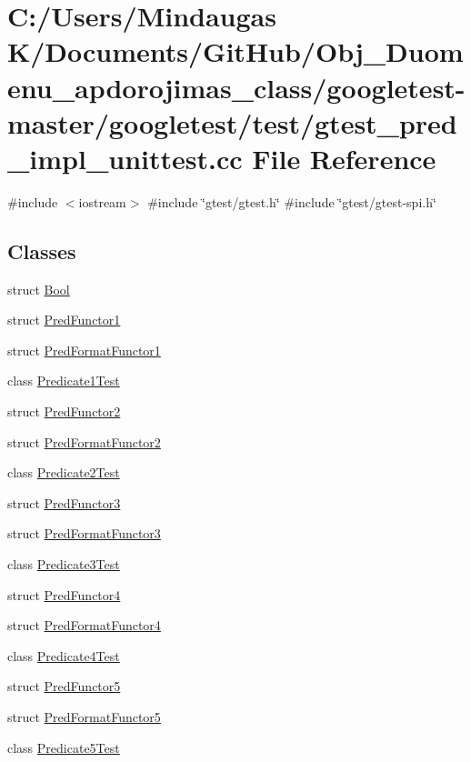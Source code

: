 \hypertarget{googletest-master_2googletest_2test_2gtest__pred__impl__unittest_8cc}{}\section{C\+:/\+Users/\+Mindaugas K/\+Documents/\+Git\+Hub/\+Obj\+\_\+\+Duomenu\+\_\+apdorojimas\+\_\+class/googletest-\/master/googletest/test/gtest\+\_\+pred\+\_\+impl\+\_\+unittest.cc File Reference}
\label{googletest-master_2googletest_2test_2gtest__pred__impl__unittest_8cc}
{\ttfamily \#include $<$iostream$>$}\newline
{\ttfamily \#include \char`\"{}gtest/gtest.\+h\char`\"{}}\newline
{\ttfamily \#include \char`\"{}gtest/gtest-\/spi.\+h\char`\"{}}\newline
\subsection*{Classes}
\begin{DoxyCompactItemize}
\item 
struct \mbox{\hyperlink{struct_bool}{Bool}}
\item 
struct \mbox{\hyperlink{struct_pred_functor1}{Pred\+Functor1}}
\item 
struct \mbox{\hyperlink{struct_pred_format_functor1}{Pred\+Format\+Functor1}}
\item 
class \mbox{\hyperlink{class_predicate1_test}{Predicate1\+Test}}
\item 
struct \mbox{\hyperlink{struct_pred_functor2}{Pred\+Functor2}}
\item 
struct \mbox{\hyperlink{struct_pred_format_functor2}{Pred\+Format\+Functor2}}
\item 
class \mbox{\hyperlink{class_predicate2_test}{Predicate2\+Test}}
\item 
struct \mbox{\hyperlink{struct_pred_functor3}{Pred\+Functor3}}
\item 
struct \mbox{\hyperlink{struct_pred_format_functor3}{Pred\+Format\+Functor3}}
\item 
class \mbox{\hyperlink{class_predicate3_test}{Predicate3\+Test}}
\item 
struct \mbox{\hyperlink{struct_pred_functor4}{Pred\+Functor4}}
\item 
struct \mbox{\hyperlink{struct_pred_format_functor4}{Pred\+Format\+Functor4}}
\item 
class \mbox{\hyperlink{class_predicate4_test}{Predicate4\+Test}}
\item 
struct \mbox{\hyperlink{struct_pred_functor5}{Pred\+Functor5}}
\item 
struct \mbox{\hyperlink{struct_pred_format_functor5}{Pred\+Format\+Functor5}}
\item 
class \mbox{\hyperlink{class_predicate5_test}{Predicate5\+Test}}
\end{DoxyCompactItemize}
